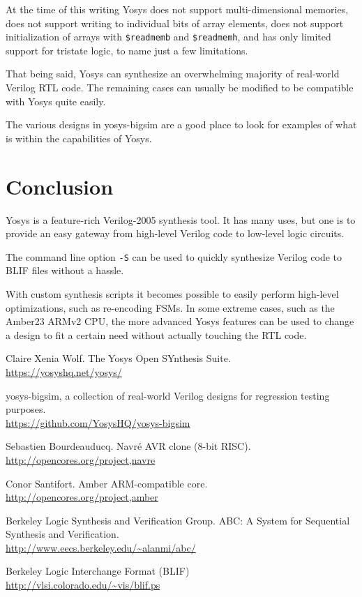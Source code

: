\documentclass[9pt,technote,a4paper]{IEEEtran}
\begin{document}
At the time of this writing Yosys does not support multi-dimensional memories,
does not support writing to individual bits of array elements, does not
support initialization of arrays with {\tt \$readmemb} and {\tt \$readmemh},
and has only limited support for tristate logic, to name just a few
limitations.

That being said, Yosys can synthesize an overwhelming majority of real-world
Verilog RTL code. The remaining cases can usually be modified to be compatible
with Yosys quite easily.

The various designs in yosys-bigsim are a good place to look for examples
of what is within the capabilities of Yosys.

\section{Conclusion}

Yosys is a feature-rich Verilog-2005 synthesis tool. It has many uses, but
one is to provide an easy gateway from high-level Verilog code to low-level
logic circuits.

The command line option {\tt -S} can be used to quickly synthesize Verilog
code to BLIF files without a hassle.

With custom synthesis scripts it becomes possible to easily perform high-level
optimizations, such as re-encoding FSMs. In some extreme cases, such as the
Amber23 ARMv2 CPU, the more advanced Yosys features can be used to change a
design to fit a certain need without actually touching the RTL code.

\begin{thebibliography}{9}

Claire Xenia Wolf. The Yosys Open SYnthesis Suite. \\
\url{https://yosyshq.net/yosys/}

yosys-bigsim, a collection of real-world Verilog designs for regression testing purposes. \\
\url{https://github.com/YosysHQ/yosys-bigsim}

Sebastien Bourdeauducq. Navr\'e AVR clone (8-bit RISC). \\
\url{http://opencores.org/project,navre}

Conor Santifort. Amber ARM-compatible core. \\
\url{http://opencores.org/project,amber}

Berkeley Logic Synthesis and Verification Group. ABC: A System for Sequential Synthesis and Verification. \\
\url{http://www.eecs.berkeley.edu/~alanmi/abc/}

Berkeley Logic Interchange Format (BLIF) \\
\url{http://vlsi.colorado.edu/~vis/blif.ps}

\end{thebibliography}
\end{document}
